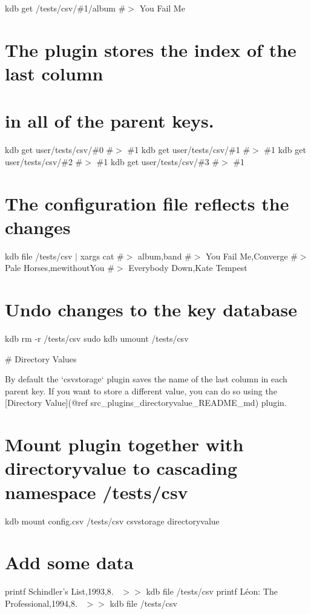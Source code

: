 kdb get /tests/csv/\#1/album \#$>$ You Fail Me

\section*{The plugin stores the index of the last column}

\section*{in all of the parent keys.}

kdb get user/tests/csv/\#0 \#$>$ \#1 kdb get user/tests/csv/\#1 \#$>$ \#1 kdb get user/tests/csv/\#2 \#$>$ \#1 kdb get user/tests/csv/\#3 \#$>$ \#1

\section*{The configuration file reflects the changes}

kdb file /tests/csv $\vert$ xargs cat \#$>$ album,band \#$>$ You Fail Me,Converge \#$>$ Pale Horses,mewithout\+You \#$>$ Everybody Down,Kate Tempest

\section*{Undo changes to the key database}

kdb rm -\/r /tests/csv sudo kdb umount /tests/csv 
\begin{DoxyCode}
# Directory Values

By default the `csvstorage` plugin saves the name of the last column in each parent key. If you want to
       store a different value, you can do
so using the [Directory Value](@ref src\_plugins\_directoryvalue\_README\_md) plugin.
\end{DoxyCode}
 \section*{Mount plugin together with {\ttfamily directoryvalue} to cascading namespace {\ttfamily /tests/csv}}

kdb mount config.\+csv /tests/csv csvstorage directoryvalue

\section*{Add some data}

printf \textquotesingle{}Schindler’s List,1993,8.~\newline
\textquotesingle{} $>$$>$ {\ttfamily kdb file /tests/csv} printf \textquotesingle{}Léon\+: The Professional,1994,8.~\newline
\textquotesingle{} $>$$>$ {\ttfamily kdb file /tests/csv}

